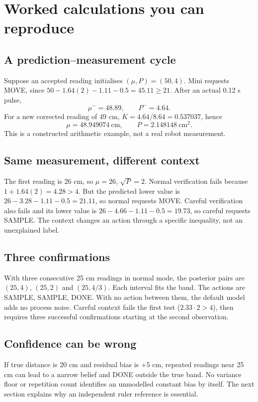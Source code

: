 \documentclass[11pt,a4paper]{article}
\begin{document}
\section{Worked calculations you can reproduce}
\subsection{A prediction--measurement cycle}
Suppose an accepted reading initialises $(\mu,P)=(50,4)$. Mini requests MOVE, since $50-1.64(2)-1.11-0.5=45.11\geq21$. After an actual 0.12 s pulse,
\[
 \mu^-=48.89,\qquad P^-=4.64.
\]
For a new corrected reading of 49 cm, $K=4.64/8.64=0.537037$, hence
\[
 \mu=48.949074\ \mathrm{cm},\qquad P=2.148148\ \mathrm{cm}^2.
\]
This is a constructed arithmetic example, not a real robot measurement.

\subsection{Same measurement, different context}
The first reading is 26 cm, so $\mu=26$, $\sqrt P=2$. Normal verification fails because $1+1.64(2)=4.28>4$. But the predicted lower value is $26-3.28-1.11-0.5=21.11$, so normal requests MOVE. Careful verification also fails and its lower value is $26-4.66-1.11-0.5=19.73$, so careful requests SAMPLE. The context changes an action through a specific inequality, not an unexplained label.

\subsection{Three confirmations}
With three consecutive 25 cm readings in normal mode, the posterior pairs are $(25,4)$, $(25,2)$ and $(25,4/3)$. Each interval fits the band. The actions are SAMPLE, SAMPLE, DONE. With no action between them, the default model adds no process noise. Careful context fails the first test ($2.33\cdot2>4$), then requires three successful confirmations starting at the second observation.

\subsection{Confidence can be wrong}
If true distance is 20 cm and residual bias is +5 cm, repeated readings near 25 cm can lead to a narrow belief and DONE outside the true band. No variance floor or repetition count identifies an unmodelled constant bias by itself. The next section explains why an independent ruler reference is essential.
\end{document}
